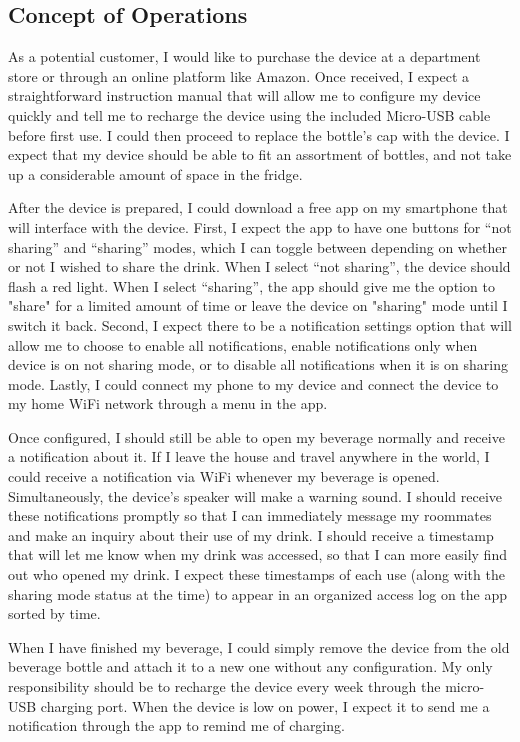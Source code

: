 \documentclass[12pt]{article}
\begin{document}
		\subsection*{Concept of Operations}
		
		As a potential customer, I would like to purchase the device at a department store or through an online platform like Amazon. Once received, I expect a straightforward instruction manual that will allow me to configure my device quickly and tell me to recharge the device using the included Micro-USB cable before first use. I could then proceed to replace the bottle’s cap with the device. I expect that my device should be able to fit an assortment of bottles, and not take up a considerable amount of space in the fridge. 
		
		After the device is prepared, I could download a free app on my smartphone that will interface with the device. First, I expect the app to have one buttons for “not sharing” and “sharing” modes, which I can toggle between depending on whether or not I wished to share the drink. When I select “not sharing”, the device should flash a red light. When I select “sharing”, the app should give me the option to "share" for a limited amount of time or leave the device on "sharing" mode until I switch it back. Second, I expect there to be a notification settings option that will allow me to choose to enable all notifications, enable notifications only when device is on not sharing mode, or to disable all notifications when it is on sharing mode. Lastly, I could connect my phone to my device and connect the device to my home WiFi network through a menu in the app. 
		
		Once configured, I should still be able to open my beverage normally and receive a notification about it. If I leave the house and travel anywhere in the world, I could receive a notification via WiFi whenever my beverage is opened. Simultaneously, the device’s speaker will make a warning sound. I should receive these notifications promptly so that I can immediately message my roommates and make an inquiry about their use of my drink. I should receive a timestamp that will let me know when my drink was accessed, so that I can more easily find out who opened my drink. I expect these timestamps of each use (along with the sharing mode status at the time) to appear in an organized access log on the app sorted by time. 
		
		When I have finished my beverage, I could simply remove the device from the old beverage bottle and attach it to a new one without any configuration. My only responsibility should be to recharge the device every week through the micro-USB charging port. When the device is low on power, I expect it to send me a notification through the app to remind me of charging.
		
\end{document}
